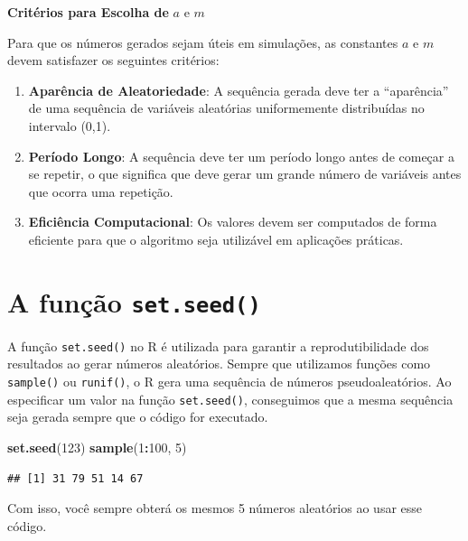 \documentclass[
]{book}
\newenvironment{Shaded}{\begin{snugshade}}{\end{snugshade}}
\newcommand{\DecValTok}[1]{\textcolor[rgb]{0.00,0.00,0.81}{#1}}
\newcommand{\FunctionTok}[1]{\textcolor[rgb]{0.13,0.29,0.53}{\textbf{#1}}}
\newcommand{\NormalTok}[1]{#1}
\newcommand{\SpecialCharTok}[1]{\textcolor[rgb]{0.81,0.36,0.00}{\textbf{#1}}}
\providecommand{\tightlist}{%
  \setlength{\itemsep}{0pt}\setlength{\parskip}{0pt}}
\begin{document}
\textbf{Critérios para Escolha de} \(a\) e \(m\)

Para que os números gerados sejam úteis em simulações, as constantes \(a\)
e \(m\) devem satisfazer os seguintes critérios:

\begin{enumerate}
\def\labelenumi{\arabic{enumi}.}
\tightlist
\item
  \textbf{Aparência de Aleatoriedade}: A sequência gerada deve ter a
  ``aparência'' de uma sequência de variáveis aleatórias uniformemente
  distribuídas no intervalo (0,1).
\item
  \textbf{Período Longo}: A sequência deve ter um período longo antes de
  começar a se repetir, o que significa que deve gerar um grande
  número de variáveis antes que ocorra uma repetição.
\item
  \textbf{Eficiência Computacional}: Os valores devem ser computados de
  forma eficiente para que o algoritmo seja utilizável em aplicações
  práticas.
\end{enumerate}

\section{\texorpdfstring{A função \texttt{set.seed()}}{A função set.seed()}}\label{a-funuxe7uxe3o-set.seed}

A função \texttt{set.seed()} no R é utilizada para garantir a reprodutibilidade
dos resultados ao gerar números aleatórios. Sempre que utilizamos
funções como \texttt{sample()} ou \texttt{runif()}, o R gera uma sequência de números
pseudoaleatórios. Ao especificar um valor na função \texttt{set.seed()},
conseguimos que a mesma sequência seja gerada sempre que o código for
executado.

\begin{Shaded}
\begin{Highlighting}[]
\FunctionTok{set.seed}\NormalTok{(}\DecValTok{123}\NormalTok{)}
\FunctionTok{sample}\NormalTok{(}\DecValTok{1}\SpecialCharTok{:}\DecValTok{100}\NormalTok{, }\DecValTok{5}\NormalTok{)}
\end{Highlighting}
\end{Shaded}

\begin{verbatim}
## [1] 31 79 51 14 67
\end{verbatim}

Com isso, você sempre obterá os mesmos 5 números aleatórios ao usar esse
código.
\end{document}
